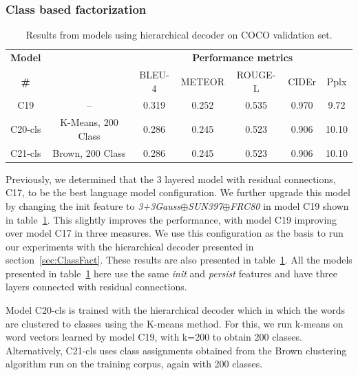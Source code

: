 \subsubsection{Class based factorization}
\begin{table}[htp]
  \centering
  \newcommand{\bs}{\small}
  \begin{adjustbox}{center}
  \begin{tabular}{|c|c|c|c|c|c|c|}
    \hline
    \bf Model & \bf \multirow{2}{*}{Class clustering} & \multicolumn{5}{c|}{\bf Performance metrics}\\
    \cline{3-7}
    \bf \# &\bf &\bs BLEU-4 &\bs METEOR &\bs ROUGE-L &\bs CIDEr&\bs Pplx \\\hline
    C19 & --    & 0.319 & 0.252 & 0.535 & 0.970 & 9.72 \\\hline
    C20-cls &\parbox[c][][c]{4cm}{\smallskip\centering K-Means, 200 Class \smallskip} 
                             & 0.286 & 0.245 & 0.523 & 0.906 & 10.10 \\\hline
    C21-cls &\parbox[c][][c]{4cm}{\smallskip\centering Brown, 200 Class\smallskip} 
                             & 0.286 & 0.245 & 0.523 & 0.906 & 10.10 \\\hline
  \end{tabular}
  \end{adjustbox}
  \caption{Results from models using hierarchical decoder on COCO validation set.}
  \label{tab:resClsCocValset}
\end{table}

Previously, we determined that the 3 layered model with residual connections,
C17, to be the best language model configuration.
We further upgrade this model by changing the init feature to
\emph{3+3Gauss$\oplus$SUN397$\oplus$FRC80} in model C19 shown in
table~\ref{tab:resClsCocValset}.
This slightly improves the performance, with model C19 improving over model C17 in
three measures. 
We use this configuration as the basis to run our experiments with the
hierarchical decoder presented in section~\ref{sec:ClassFact}.
These results are also presented in table~\ref{tab:resClsCocValset}.
All the models presented in table~\ref{tab:resClsCocValset} here use the same
\emph{init} and \emph{persist} features and have three layers connected with
residual connections.

Model C20-cls is trained with the hierarchical decoder which in which the words
are clustered to classes using the K-means method. 
For this, we run k-means on word vectors learned by model C19, with k=200 to
obtain 200 classes. 
Alternatively, C21-cls uses class assignments obtained from the Brown clustering
algorithm run on the training corpus, again with 200 classes.

